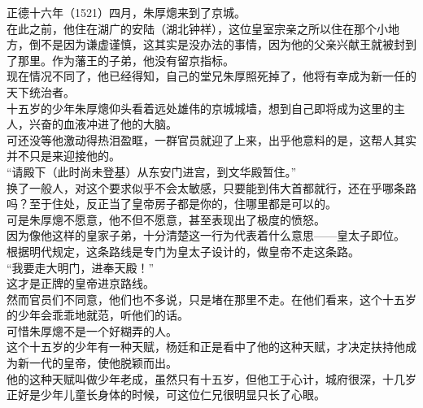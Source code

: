 	\begin{multicols}{\theparacolNo}
\fi
正德十六年（1521）四月，朱厚熜来到了京城。\\

在此之前，他住在湖广的安陆（湖北钟祥），这位皇室宗亲之所以住在那个小地方，倒不是因为谦虚谨慎，这其实是没办法的事情，因为他的父亲兴献王就被封到了那里。作为藩王的子弟，他没有留京指标。\\

现在情况不同了，他已经得知，自己的堂兄朱厚照死掉了，他将有幸成为新一任的天下统治者。\\

十五岁的少年朱厚熜仰头看着远处雄伟的京城城墙，想到自己即将成为这里的主人，兴奋的血液冲进了他的大脑。\\

可还没等他激动得热泪盈眶，一群官员就迎了上来，出乎他意料的是，这帮人其实并不只是来迎接他的。\\

“请殿下（此时尚未登基）从东安门进宫，到文华殿暂住。”\\

换了一般人，对这个要求似乎不会太敏感，只要能到伟大首都就行，还在乎哪条路吗？至于住处，反正当了皇帝房子都是你的，住哪里都是可以的。\\

可是朱厚熜不愿意，他不但不愿意，甚至表现出了极度的愤怒。\\

因为像他这样的皇家子弟，十分清楚这一行为代表着什么意思——皇太子即位。\\

根据明代规定，这条路线是专门为皇太子设计的，做皇帝不走这条路。\\

“我要走大明门，进奉天殿！”\\

这才是正牌的皇帝进京路线。\\

然而官员们不同意，他们也不多说，只是堵在那里不走。在他们看来，这个十五岁的少年会乖乖地就范，听他们的话。\\

可惜朱厚熜不是一个好糊弄的人。\\

这个十五岁的少年有一种天赋，杨廷和正是看中了他的这种天赋，才决定扶持他成为新一代的皇帝，使他脱颖而出。\\

他的这种天赋叫做少年老成，虽然只有十五岁，但他工于心计，城府很深，十几岁正好是少年儿童长身体的时候，可这位仁兄很明显只长了心眼。\\


\end{multicols}
